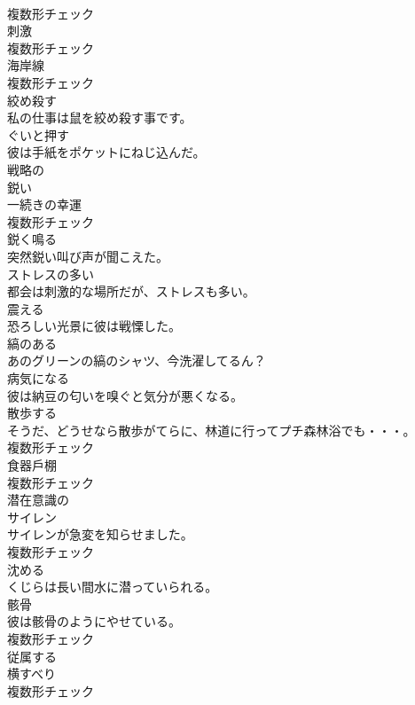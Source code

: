 \documentclass[8pt]{extreport}
\begin{document}
\begin{CJK}{UTF8}{min}
\\	複数形チェック
\\	[名詞]	刺激	
\\	複数形チェック
\\	[名詞]	海岸線	
\\	複数形チェック
\\	[動詞]	絞め殺す	
\\	私の仕事は鼠を絞め殺す事です。	
\\	[動詞]	ぐいと押す	
\\	彼は手紙をポケットにねじ込んだ。	
\\	[形容詞]	戦略の	
\\	[形容詞]	鋭い	
\\	[名詞]	一続きの幸運	
\\	複数形チェック
\\	[動詞]	鋭く鳴る	
\\	突然鋭い叫び声が聞こえた。	
\\	[形容詞]	ストレスの多い	
\\	都会は刺激的な場所だが、ストレスも多い。	
\\	[動詞]	震える	
\\	恐ろしい光景に彼は戦慄した。	
\\	[形容詞]	縞のある	
\\	あのグリーンの縞のシャツ、今洗濯してるん？	
\\	[動詞]	病気になる	
\\	彼は納豆の匂いを嗅ぐと気分が悪くなる。	
\\	[名詞]	散歩する	
\\	そうだ、どうせなら散歩がてらに、林道に行ってプチ森林浴でも・・・。	
\\	複数形チェック
\\	[名詞]	食器戶棚	
\\	複数形チェック
\\	[形容詞]	潜在意識の	
\\	[名詞]	サイレン	
\\	サイレンが急変を知らせました。	
\\	複数形チェック
\\	[動詞]	沈める	
\\	くじらは長い間水に潜っていられる。	
\\	[名詞]	骸骨	
\\	彼は骸骨のようにやせている。	
\\	複数形チェック
\\	[形容詞]	従属する	
\\	[名詞]	横すべり	
\\	複数形チェック

\end{CJK}
\end{document}
